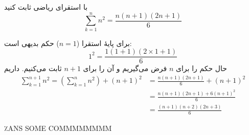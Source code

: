با استقرای ریاضی ثابت کنید
$$
\sum_{k=1}^{n}n^2=\frac{n(n+1)(2n+1)}{6}
$$
\begin{ans}
  برای پایهٔ استقرا ($n=1$) حکم بدیهی است:
  $$
  1^2 = \frac{1(1+1)(2\times 1+1)}{6}
  $$
  حال حکم را برای $n$ فرض می‌گیریم و آن را برای $n+1$ ثابت می‌کنیم. داریم
  \begin{align*}
  \sum_{k=1}^{n+1}n^2=(\sum_{k=1}^{n}n^2)+(n+1)^2&=\frac{n(n+1)(2n+1)}{6}+(n+1)^2\\
  &=\frac{n(n+1)(2n+1)+6(n+1)^2}{6}\\
  &=\frac{(n+1)(n+2)(2n+3)}{6}
  \end{align*}
\end{ans}
٪ANS SOME COMMMMMMMM
